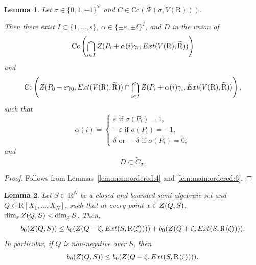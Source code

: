 \documentclass[10pt]{amsart}
\newtheorem{lemma}{Lemma}[section]
\theoremstyle{definition}
\theoremstyle{remark}
\numberwithin{equation}{section}
\newcommand {\R} {\mathrm{R}}
\newcommand {\ZZ} {{\rm Z}}
\newcommand {\RR} {{\mathcal R}}
\newcommand {\la}   {{\langle}}
\newcommand {\ra}   {{\rangle}}
\newcommand {\eps} {{\varepsilon}}
\newcommand {\E} {{\rm Ext}}
\newcommand{\Cc}{\mathrm{Cc}}
\begin{document}
\begin{lemma}
\label{lem:main:ordered:7}
    Let $\sigma \in \{0,1,-1\}^{\mathcal{P}}$ and  
    $C \in \Cc(\RR(\sigma,V(\R)))$.
   
    Then there exist
    $I \subset \{1,\ldots,s\}$, 
    $\alpha \in \{\pm \eps,\pm \delta\}^I$,
    and $D$ in the union of 
    \[
    \Cc\left(\bigcap_{i\in I}
    \ZZ(P_i + \alpha(i)\gamma_i,\E(V(\R),\widetilde{\R}))\right)
    \]
    and 
    \[ 
    \Cc\left(\ZZ(P_0 - \eps \gamma_0,\E(V(\R),\widetilde{\R}))
    \cap 
    \bigcap_{i\in I} \ZZ(P_i + \alpha(i)\gamma_i,\E(V(\R),\widetilde{\R}))\right),
    \]
    such that 
    \[
    \alpha(i) = \begin{cases}
                    \eps \text{ if } \sigma(P_i) = 1, \\
                    -\eps \text{  if  } \sigma(P_i) = -1, \\
                    \delta \text{ or } -\delta \text{ if } \sigma(P_i) = 0,
                \end{cases}
    \]
    and  
    \[
    D \subset \widetilde{C}_\sigma.
    \]
\end{lemma}

\begin{proof}
    Follows from Lemmas~\ref{lem:main:ordered:4} and
    \ref{lem:main:ordered:6}.
\end{proof}

\begin{lemma}
\label{lem:main:ordered:8}
    Let $S \subset \R^N$ be a closed and bounded semi-algebraic set and
    $Q \in \R[X_1,\ldots,X_N]$, such that at every point $x \in \ZZ(Q,S)$,
    $\dim_x \ZZ(Q,S) < \dim_x S$.
    Then,
    \[
    b_0(\ZZ(Q,S)) \leq b_0(\ZZ(Q-\zeta, \E(S,\R\la\zeta\ra))) + b_0(\ZZ(Q+\zeta, \E(S,\R\la\zeta\ra))).
    \]
    In particular, if $Q$ is non-negative over $S$, then 
    \[
    b_0(\ZZ(Q,S)) \leq b_0(\ZZ(Q-\zeta, \E(S,\R\la\zeta\ra))).
    \]
\end{lemma}
\end{document}
